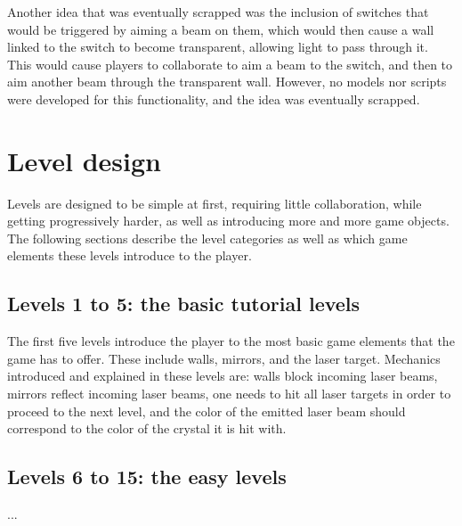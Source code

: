 			Another idea that was eventually scrapped was the inclusion of
			switches that would be triggered by aiming a beam on them, which
			would then cause a wall linked to the switch to become transparent,
			allowing light to pass through it. This would cause players to
			collaborate to aim a beam to the switch, and then to aim another
			beam through the transparent wall. However, no models nor scripts
			were developed for this functionality, and the idea was eventually
			scrapped.
			
	\section{Level design} \label{sec:leveldesign}
		Levels are designed to be simple at first, requiring little collaboration,
		while getting progressively harder, as well as introducing more and more
		game objects. The following sections describe the level categories as
		well as which game elements these levels introduce to the player.

		\subsection{Levels 1 to 5: the basic tutorial levels} \label{ssec:basiclevels}
			The first five levels introduce the player to the most basic game
			elements that the game has to offer. These include walls, mirrors,
			and the laser target. Mechanics introduced and explained in these
			levels are: walls block incoming laser beams, mirrors reflect
			incoming laser beams, one needs to hit all laser targets in order
			to proceed to the next level, and the color of the emitted laser
			beam should correspond to the color of the crystal it is hit with.
			
		\subsection{Levels 6 to 15: the easy levels} \label{ssec: easylevels}
			...